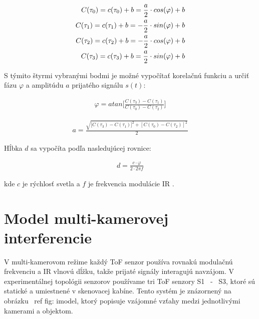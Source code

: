\begin{equation}
\label{eq::tof::06}
\begin{aligned}
C(\tau _0) = c(\tau _0) + b}=  {{\frac{a}{2}} \cdot cos(\varphi) +b \\
C(\tau _1) = c(\tau _1) + b}= - {{\frac{a}{2}} \cdot sin(\varphi) +b \\
C(\tau _2) = c(\tau _2) + b}=- {{\frac{a}{2}} \cdot cos(\varphi) +b \\
C(\tau _3) = c(\tau _3) + b}= {{\frac{a}{2}} \cdot sin(\varphi) +b 
\end{aligned}
\end{equation}

\noindent S týmito štyrmi vybranými bodmi je možné vypočítať korelačnú funkciu a určiť fázu $\varphi$ a amplitúdu $a$ prijatého signálu $s(t)$:

\begin{equation}
\label{eq::tof::07}
\begin{aligned}
\varphi = atan \Bigg[ {\frac{C(\tau _3) - C(\tau _1)}{C(\tau _0) - C(\tau _2)}} \Bigg]
\end{aligned}
\end{equation}

\begin{equation}
\label{eq::tof::08}
\begin{aligned}
 a =  \frac{\sqrt{{[C(\tau _3) - C(\tau _1)}]^2 + [{C(\tau _0) - C(\tau _2)}]^2}}{2}  
\end{aligned}
\end{equation}


\noindent Hĺbka $d$ sa vypočíta podľa nasledujúcej rovnice:


\begin{equation}
\label{eq::tof::09}
\begin{aligned}
 d = \frac{ c \cdot \varphi }{ 2 \cdot 2 \pi f}
\end{aligned}
\end{equation}

\noindent kde $c$ je rýchlosť svetla a $f$ je frekvencia modulácie IR \cite {Lange}.


\section{Model multi-kamerovej interferencie}

V multi-kamerovom režime každý ToF senzor používa rovnakú modulačnú frekvenciu a IR vlnovú dĺžku, takže prijaté signály interagujú navzájom. V experimentálnej topológii senzorov používame tri ToF senzory S1 \, - \, S3, ktoré sú statické a umiestnené v skenovacej kabíne. Tento systém je znázornený na obrázku \ ref {fig: imodel}, ktorý popisuje vzájomné vzťahy medzi jednotlivými kamerami a objektom.

